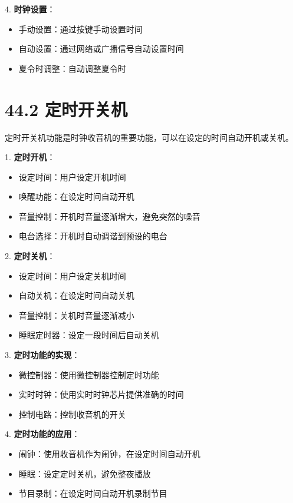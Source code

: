 \documentclass[12pt,UTF8]{ctexbook}
\begin{document}
4. \textbf{时钟设置}：
   \begin{itemize}[leftmargin=3.5em]
   \item 手动设置：通过按键手动设置时间
   \item 自动设置：通过网络或广播信号自动设置时间
   \item 夏令时调整：自动调整夏令时
   \end{itemize}

\section*{44.2 定时开关机}

定时开关机功能是时钟收音机的重要功能，可以在设定的时间自动开机或关机。

1. \textbf{定时开机}：
   \begin{itemize}[leftmargin=3.5em]
   \item 设定时间：用户设定开机时间
   \item 唤醒功能：在设定时间自动开机
   \item 音量控制：开机时音量逐渐增大，避免突然的噪音
   \item 电台选择：开机时自动调谐到预设的电台
   \end{itemize}

2. \textbf{定时关机}：
   \begin{itemize}[leftmargin=3.5em]
   \item 设定时间：用户设定关机时间
   \item 自动关机：在设定时间自动关机
   \item 音量控制：关机时音量逐渐减小
   \item 睡眠定时器：设定一段时间后自动关机
   \end{itemize}

3. \textbf{定时功能的实现}：
   \begin{itemize}[leftmargin=3.5em]
   \item 微控制器：使用微控制器控制定时功能
   \item 实时时钟：使用实时时钟芯片提供准确的时间
   \item 控制电路：控制收音机的开关
   \end{itemize}

4. \textbf{定时功能的应用}：
   \begin{itemize}[leftmargin=3.5em]
   \item 闹钟：使用收音机作为闹钟，在设定时间自动开机
   \item 睡眠：设定定时关机，避免整夜播放
   \item 节目录制：在设定时间自动开机录制节目
   \end{itemize}
\end{document}
